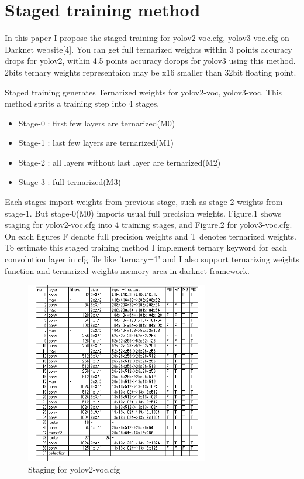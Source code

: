 \documentclass[twocolumn]{article}
\begin{document}
\section{Staged training method}
In this paper I propose the staged training for yolov2-voc.cfg, yolov3-voc.cfg on Darknet website[4].
You can get full ternarized weights within 3 points accuracy drops for yolov2, within 4.5 points accuracy dorops for yolov3 using this method.
2bits ternary weights representaion may be x16 smaller than 32bit floating point.

Staged training generates Ternarized weights for yolov2-voc, yolov3-voc.
This method sprits a training step into 4 stages.

\begin{itemize}
\item Stage-0 : first few layers are ternarized(M0)
\item Stage-1 : last few layers are ternarized(M1)
\item Stage-2 : all layers without last layer are ternarized(M2)
\item Stage-3 : full ternarized(M3)
\end{itemize}

Each stages import weights from previous stage, such as stage-2 weights from stage-1.
But stage-0(M0) imports usual full precision weights.
Figure.1 shows staging for yolov2-voc.cfg into 4 training stages, and Figure.2 for yolov3-voc.cfg.
On each figures F denote full precision weights and T denotes ternarized weights.
To estimate this staged training method I implement ternary keyword for each convolution layer in cfg file like 'ternary=1' and I also support ternarizing weights function and ternarized weights memory area in darknet framework.

\begin{figure}
\includegraphics[width=8cm]{yolov2-voc_Stages.png}
\caption{Staging for yolov2-voc.cfg}
\end{figure}
\end{document}
